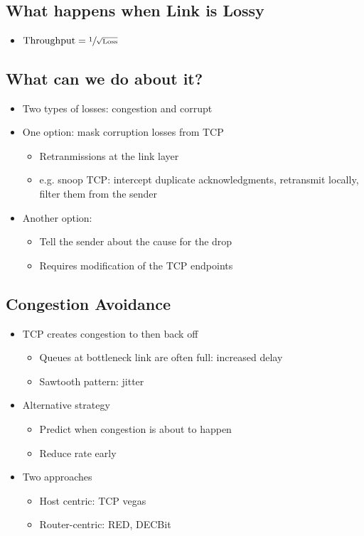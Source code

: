 \subsection{What happens when Link is Lossy}
\begin{itemize}[nosep]
    \item $\text{Throughput} = \sfrac{1}{\sqrt{\text{Loss}}}$
\end{itemize}
\subsection{What can we do about it?}
\begin{itemize}[nosep]
    \item Two types of losses: congestion and corrupt
    \item One option: mask corruption losses from TCP
          \begin{itemize}[nosep]
              \item Retranmissions at the link layer
              \item e.g. snoop TCP: intercept duplicate acknowledgments, retransmit locally, filter them from the sender
          \end{itemize}
    \item Another option:
          \begin{itemize}[nosep]
              \item Tell the sender about the cause for the drop
              \item Requires modification of the TCP endpoints
          \end{itemize}
\end{itemize}
\subsection{Congestion Avoidance}
\begin{itemize}[nosep]
    \item TCP creates congestion to then back off
          \begin{itemize}[nosep]
              \item Queues at bottleneck link are often full: increased delay
              \item Sawtooth pattern: jitter
          \end{itemize}
    \item Alternative strategy
          \begin{itemize}[nosep]
              \item Predict when congestion is about to happen
              \item Reduce rate early
          \end{itemize}
    \item Two approaches
          \begin{itemize}[nosep]
              \item Host centric: TCP vegas
              \item Router-centric: RED, DECBit
          \end{itemize}
\end{itemize}
